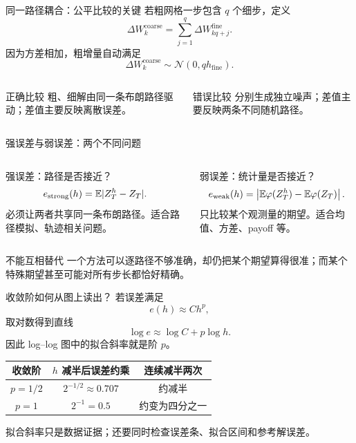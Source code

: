 \documentclass[aspectratio=169,10pt,fontset=none]{ctexbeamer}
\newcommand{\E}{\mathbb{E}}
\newcommand{\Normal}{\mathcal{N}}
\begin{document}
\begin{frame}{同一路径耦合：公平比较的关键}
  若粗网格一步包含 $q$ 个细步，定义
  \[
    \Delta W^{\text{coarse}}_k
      =\sum_{j=1}^{q}\Delta W^{\text{fine}}_{kq+j}.
  \]
  因为方差相加，粗增量自动满足
  \[
    \Delta W^{\text{coarse}}_k\sim\Normal(0,qh_{\text{fine}}).
  \]
  \begin{columns}[T]
      \begin{block}{正确比较}
        粗、细解由同一条布朗路径驱动；差值主要反映离散误差。
      \end{block}
      \begin{block}{错误比较}
        分别生成独立噪声；差值主要反映两条不同随机路径。
      \end{block}
  \end{columns}
\end{frame}

\begin{frame}{强误差与弱误差：两个不同问题}
  \begin{columns}[T]
    \begin{block}{强误差：路径是否接近？}
      \[
        e_{\rm strong}(h)=\E|Z_T^h-Z_T|.
      \]
      必须让两者共享同一条布朗路径。适合路径模拟、轨迹相关问题。
    \end{block}
    \begin{block}{弱误差：统计量是否接近？}
      \[
        e_{\rm weak}(h)=
        \left|\E\varphi(Z_T^h)-\E\varphi(Z_T)\right|.
      \]
      只比较某个观测量的期望。适合均值、方差、payoff 等。
    \end{block}
  \end{columns}
  \begin{alertblock}{不能互相替代}
    一个方法可以逐路径不够准确，却仍把某个期望算得很准；而某个特殊期望甚至可能对所有步长都恰好精确。
  \end{alertblock}
\end{frame}

\begin{frame}{收敛阶如何从图上读出？}
  若误差满足
  \[
    e(h)\approx Ch^p,
  \]
  取对数得到直线
  \[
    \log e\approx \log C+p\log h.
  \]
  因此 log--log 图中的拟合斜率就是阶 $p$。
  \begin{center}
    \begin{tabular}{ccc}
      \toprule
      收敛阶 & $h$ 减半后误差约乘 & 连续减半两次 \\
      \midrule
      $p=1/2$ & $2^{-1/2}\approx0.707$ & 约减半 \\
      $p=1$   & $2^{-1}=0.5$          & 约变为四分之一 \\
      \bottomrule
    \end{tabular}
  \end{center}
  \alert{拟合斜率只是数据证据；还要同时检查误差条、拟合区间和参考解误差。}
\end{frame}
\end{document}
